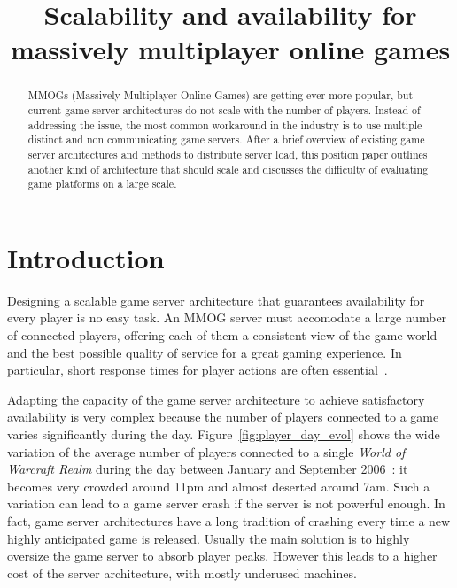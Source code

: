 \documentclass[conference]{IEEEtran}
\begin{document}
\title{Scalability and availability for massively multiplayer online games}


\author{
\and
{}
\and
{}
}

\maketitle


\begin{abstract}
MMOGs (Massively Multiplayer Online Games) are getting ever more popular, but current game server architectures do not scale with the number of players. Instead of addressing the issue, the most common workaround in the industry is to use multiple distinct and non communicating game servers.
After a brief overview of existing game server architectures and methods to distribute server load, this position paper outlines another kind of architecture that should scale and discusses the difficulty of evaluating game platforms on a large scale.
\end{abstract}

\section{Introduction}
Designing a scalable game server architecture that guarantees availability for every player is no easy task.
An MMOG server must accomodate a large number of connected players, offering each of them a consistent view of the game world and the best possible quality of service for a great gaming experience. In particular, short response times for player actions are often essential~\cite{latency_can_kill}. 

Adapting the capacity of the game server architecture to achieve satisfactory availability is very complex because the number of players connected to a game varies significantly during the day. Figure~\ref{fig:player_day_evol} shows the wide variation of the average number of players connected to a single \textit{World of Warcraft Realm} during the day between January and September 2006~\cite{is_server_consolidation_benefical}: it becomes very crowded around 11pm and almost deserted around 7am. Such a variation can lead to a game server crash if the server is not powerful enough. In fact, game server architectures have a long tradition of crashing every time a new highly anticipated game is released. Usually the main solution is to highly oversize the game server to absorb player peaks. However this leads to a higher cost of the server architecture, with mostly underused machines.
\end{document}
